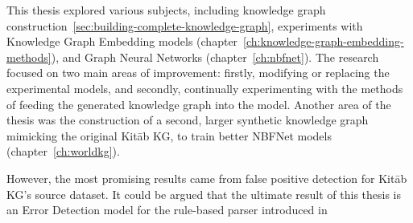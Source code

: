 This thesis explored various subjects, including knowledge graph construction~\ref{sec:building-complete-knowledge-graph},
experiments with Knowledge Graph Embedding models (chapter~\ref{ch:knowledge-graph-embedding-methods}), and Graph Neural Networks (chapter~\ref{ch:nbfnet}).
The research focused on two main areas of improvement: firstly, modifying or replacing the experimental models,
and secondly, continually experimenting with the methods of feeding the generated knowledge graph into the model.
Another area of the thesis was the construction of a second, larger synthetic knowledge graph mimicking the original
Kitāb KG, to train better NBFNet models (chapter~\ref{ch:worldkg}).

However, the most promising results came from false positive detection for Kitāb KG's source dataset.
It could be argued that the ultimate result of this thesis is an Error Detection model for the rule-based parser introduced in ~\cite{YaqutRB}

